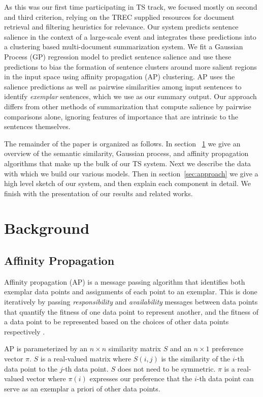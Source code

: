 \documentclass[10pt]{article} \usepackage{url} \usepackage{color}
\begin{document}
As this was our first time participating in TS track, we focused mostly on 
second and third criterion, relying on the TREC supplied resources for 
document retrieval and filtering heuristics for relevance.
Our system predicts sentence salience in the context of a
large-scale event and integrates these predictions into
a clustering based multi-document summarization system. We fit a Gaussian 
Process (GP) regression model to predict sentence salience and use 
these predictions to bias the
formation of sentence clusters around more salient regions in the input space
using affinity propagation (AP) clustering.  AP uses the salience predictions
as well as pairwise similarities among input sentences to identify
\emph{exemplar} sentences, which we use as our summary output.  Our approach
differs from other methods of summarization that compute salience by pairwise
comparisons alone, ignoring features of importance that are intrinsic to the
sentences themselves.

The remainder of the paper is organized as follows. In section
~\ref{sec:background} we give an overview of the semantic similarity, 
Gaussian process, and affinity propagation algorithms that make up the bulk of
our TS system. 
Next we describe the data with which we build our various models.
Then in section~\ref{sec:approach} we give a high level sketch
of our system, and then explain each component in detail. 
We finish with the presentation of our results and related works.


\section{Background}\label{sec:background}

\subsection{Affinity Propagation}

Affinity propagation (AP) is a message passing algorithm that identifies both
exemplar data points and assignments of each point to an exemplar.  This is
done iteratively by passing \emph{responsibility} and \emph{availability}
messages between data points that quantify the fitness of one data point to
represent another, and the fitness of a data point to be represented based on
the choices of other data points respectively \cite{dueck2007non}.

AP is parameterized by an $n\times n$ similarity matrix $S$ and an $n\times 1$
preference vector $\pi$.  $S$ is a real-valued matrix where $S(i,j)$ is the
similarity of the $i$-th data point to the $j$-th data point.  $S$ does not
need to be symmetric.  $\pi$ is a real-valued vector where $\pi(i)$ expresses
our preference that the $i$-th data point can serve as an exemplar a priori of
other data points. 
\end{document}
